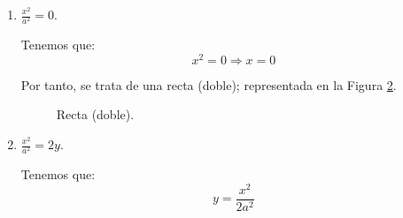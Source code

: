 \begin{enumerate}
    Tenemos que:
    \begin{equation*}
        x^2 = a^2 \Longrightarrow x=\pm a
    \end{equation*}

    Por tanto, se trata de un par de rectas paralelas; representadas en la Figura \ref{fig:RectaDoblePar}.
    \begin{figure}
        \centering
        \caption{Par de rectas paralelas.}
        \label{fig:RectaDoblePar}
    \end{figure}
    
    \item $\displaystyle \frac{x^2}{a^2} = 0$.

    Tenemos que:
    \begin{equation*}
        x^2 = 0 \Longrightarrow x=0
    \end{equation*}

    Por tanto, se trata de una recta (doble); representada en la Figura \ref{fig:Recta}.
    \begin{figure}
        \centering
        \caption{Recta (doble).}
        \label{fig:Recta}
    \end{figure}
    
    \item $\displaystyle \frac{x^2}{a^2} = 2y$.

    Tenemos que:
    \begin{equation*}
        y = \frac{x^2}{2a^2}
    \end{equation*}


\end{enumerate}
